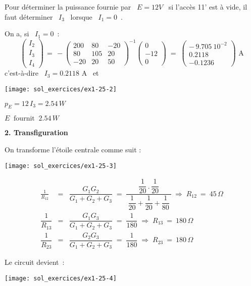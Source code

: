 Pour déterminer la puissance fournie par \ $E=12V$ \ si l'accès 11'
est à vide, il faut déterminer \ $I_3$ \ lorsque \ $I_1=0$~.

On a, si \ $I_1=0$~:
\[ \left( \begin{array}{c} I_2\\ I_3\\ I_4 \end{array} \right) 
\, = \, -\left( \begin{array}{rrr}
200 & 80 & -20\\
80 & 105 & 20\\
-20 & 20 & 50
\end{array} \right) ^{-1}
\left( \begin{array}{c} 0\\ -12\\ 0 \end{array} \right) 
\; = \; 
\left( \begin{array}{c} 
-\, 9.705~10^{-2}\\ 0.2118 \\ -0.1236
\end{array} \right) \text{~A} \]
c'est-à-dire \ $I_3 = 0.2118$ A \ et

\parbox[c]{5cm}{\begin{center}
\texttt{[image: sol\_exercices/ex1-25-2]}
\end{center}}
\parbox[c]{5cm}{
$p_E = 12\, I_3 = 2.54\, W$

$E~\mbox{~fournit~} ~2.54\, W$}

{\bf 2. Transfiguration}

On transforme l'étoile centrale comme suit : 
\begin{center}
\texttt{[image: sol\_exercices/ex1-25-3]}
\end{center}

\begin{eqnarray*}
\frac{1}{R_{12}} &=& \dfrac{G_1G_2}{G_1+G_2+G_3}
\; = \; \dfrac{~\dfrac{1}{20}\, . \, \dfrac{1}{20}~}
{~\dfrac{1}{20} + \dfrac{1}{20} + \dfrac{1}{80}~}\: 
\Rightarrow \; R_{12} \: = \: 45\, \Omega\\
\dfrac{1}{R_{13}} &=& \dfrac{G_1G_3}{G_1+G_2+G_3}
\; = \; \dfrac{1}{180} \; \Rightarrow \; R_{13} \: = \: 180\, \Omega\\
\dfrac{1}{R_{23}} &=& \dfrac{G_2G_3}{G_1+G_2+G_3}
\; = \; \dfrac{1}{180} \; \Rightarrow \; R_{23} \: = \: 180\, \Omega
\end{eqnarray*}

Le circuit devient~:
\begin{center}
\texttt{[image: sol\_exercices/ex1-25-4]}
\end{center}

